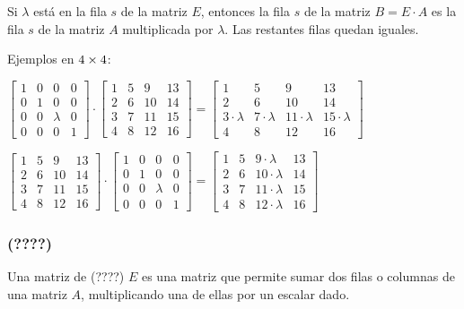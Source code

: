 Si $\lambda$ está en la fila $s$ de la matriz $E$, entonces la fila $s$ de la matriz $B = E \cdot A$ es la fila $s$ de la matriz $A$ multiplicada por $\lambda$. Las restantes filas quedan iguales.

Ejemplos en $4\times 4$:
\begin{center}
	$\begin{bmatrix}
		1&0&0&0 \\
		0&1&0&0 \\
		0&0&\lambda&0 \\
		0&0&0&1
	\end{bmatrix} \cdot
	\begin{bmatrix}
		1&5&9&13 \\
		2&6&10&14 \\
		3&7&11&15 \\
		4&8&12&16
	\end{bmatrix} =
	\begin{bmatrix}
		1&5&9&13 \\
		2&6&10&14 \\
		3\cdot\lambda&7\cdot\lambda&11\cdot\lambda&15\cdot\lambda \\
		4&8&12&16
	\end{bmatrix}
	$
\end{center}

\begin{center}
	$\begin{bmatrix}
		1&5&9&13 \\
		2&6&10&14 \\
		3&7&11&15 \\
		4&8&12&16
	\end{bmatrix} \cdot
	\begin{bmatrix}
			1&0&0&0 \\
			0&1&0&0 \\
			0&0&\lambda&0 \\
			0&0&0&1
		\end{bmatrix} =
	\begin{bmatrix}
		1&5&9\cdot\lambda&13 \\
		2&6&10\cdot\lambda&14 \\
		3&7&11\cdot\lambda&15 \\
		4&8&12\cdot\lambda&16
	\end{bmatrix}
	$
\end{center}


\subsubsection{(????)}
Una matriz de (????) $E$ es una matriz que permite sumar dos filas o columnas de una matriz $A$, multiplicando una de ellas por un escalar dado.

